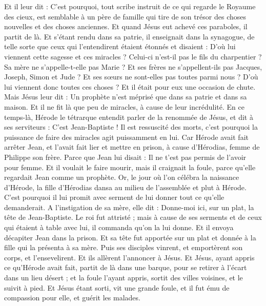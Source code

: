 \begin{multicols}{2}
Et il leur dit : C’est pourquoi, tout scribe instruit de ce qui regarde le Royaume des cieux, est semblable à un père de famille qui tire de son trésor des choses nouvelles et des choses anciennes.
Et quand Jésus eut achevé ces paraboles, il partit de là.
Et s’étant rendu dans sa patrie, il enseignait dans la synagogue, de telle sorte que ceux qui l’entendirent étaient étonnés et disaient : D’où lui viennent cette sagesse et ces miracles ?
Celui-ci n'est-il pas le fils du charpentier ? Sa mère ne s'appelle-t-elle pas Marie ? Et ses frères ne s'appellent-ils pas Jacques, Joseph, Simon et Jude ?
Et ses sœurs ne sont-elles pas toutes parmi nous ? D'où lui viennent donc toutes ces choses ?
Et il était pour eux une occasion de chute. Mais Jésus leur dit : Un prophète n'est méprisé que dans sa patrie et dans sa maison.
Et il ne fit là que peu de miracles, à cause de leur incrédulité.
\VerseOne{}En ce temps-là, Hérode le tétrarque entendit parler de la renommée de Jésus, et dit à ses serviteurs : C’est Jean-Baptiste !
Il est ressuscité des morts, c'est pourquoi la puissance de faire des miracles agit puissamment en lui.
Car Hérode avait fait arrêter Jean, et l'avait fait lier et mettre en prison, à cause d'Hérodias, femme de Philippe son frère.
Parce que Jean lui disait : Il ne t'est pas permis de l'avoir pour femme.
Et il voulait le faire mourir, mais il craignait la foule, parce qu’elle regardait Jean comme un prophète.
Or, le jour où l’on célébra la naissance d'Hérode, la fille d'Hérodias dansa au milieu de l’assemblée et plut à Hérode.
C'est pourquoi il lui promit avec serment de lui donner tout ce qu'elle demanderait.
A l’instigation de sa mère, elle dit : Donne-moi ici, sur un plat, la tête de Jean-Baptiste.
Le roi fut attristé ; mais à cause de ses serments et de ceux qui étaient à table avec lui, il commanda qu'on la lui donne.
Et il envoya décapiter Jean dans la prison.
Et sa tête fut apportée sur un plat et donnée à la fille qui la présenta à sa mère.
Puis ses disciples vinrent, et emportèrent son corps, et l'ensevelirent. Et ils allèrent l’annoncer à Jésus.
Et Jésus, ayant appris ce qu’Hérode avait fait, partit de là dans une barque, pour se retirer à l’écart dans un lieu désert ; et la foule l’ayant appris, sortit des villes voisines, et le suivit à pied.
Et Jésus étant sorti, vit une grande foule, et il fut ému de compassion pour elle, et guérit les malades.

\end{multicols}
